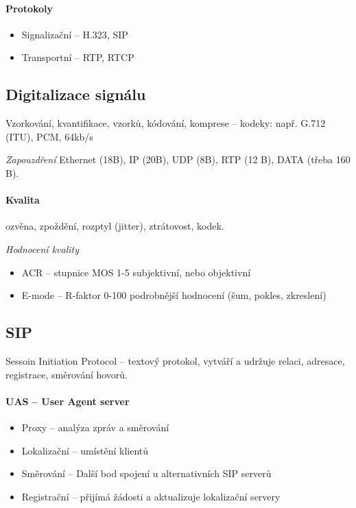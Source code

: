 \documentclass[a4wide]{report}
\begin{document}
\paragraph{Protokoly}
\begin{itemize}
	\item Signalizační -- H.323, SIP
	\item Transportní -- RTP, RTCP
\end{itemize}

\subsection{Digitalizace signálu}

Vzorkování, kvantifikace, vzorků, kódování, komprese -- kodeky: např. G.712 (ITU), PCM, 64kb/s

\emph{Zapouzdření} Ethernet (18B), IP (20B), UDP (8B), RTP (12 B), DATA (třeba 160 B).

\paragraph{Kvalita} ozvěna, zpoždění, rozptyl (jitter), ztrátovost, kodek.

\emph{Hodnocení kvality}
\begin{itemize}
	\item ACR -- stupnice MOS 1-5 subjektivní, nebo objektivní
	\item E-mode -- R-faktor 0-100 podrobnější hodnocení (šum, pokles, zkreslení)
\end{itemize}

\subsection{SIP}
Sessoin Initiation Protocol -- textový protokol, vytváří a udržuje relaci, adresace, registrace, směrování hovorů.

\paragraph{UAS -- User Agent server}
\begin{itemize}
	\item Proxy -- analýza zpráv a směrování
	\item Lokalizační -- umístění klientů
	\item Směrování -- Další bod spojení u alternativních SIP serverů
	\item Registrační -- přijímá žádosti a aktualizuje lokalizační servery
\end{itemize}
\end{document}
